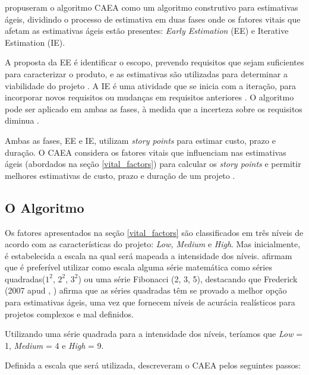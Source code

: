 
 propuseram o algoritmo CAEA como um algoritmo construtivo para estimativas ágeis,
dividindo o processo de estimativa em duas fases onde os fatores vitais que afetam as estimativas ágeis
estão presentes: \textit{Early Estimation} (EE) e {Iterative Estimation} (IE).

A proposta da EE é identificar o escopo, prevendo requisitos que sejam suficientes para caracterizar o produto,
e as estimativas são utilizadas para determinar a viabilidade do projeto \cite{bhalerao09}.
A IE é uma atividade que se inicia com a iteração, para incorporar novos requisitos ou mudanças
em requisitos anteriores \cite{bhalerao09}.
O algoritmo pode ser aplicado em ambas as fases, à medida que a incerteza sobre os requisitos diminua \cite{bhalerao09}.

Ambas as fases, EE e IE, utilizam \textit{story points} para estimar custo, prazo e duração. O CAEA considera os fatores
vitais que influenciam nas estimativas ágeis (abordados na seção \ref{vital_factors}) para calcular os \textit{story points}
e permitir melhores estimativas de custo, prazo e duração de um projeto \cite{bhalerao09}.

  \subsection*{O Algoritmo}
    
    Os fatores apresentados na seção \ref{vital_factors} são classificados em três 
    níveis de acordo com as características do projeto: \textit{Low, Medium} e \textit{High}.
    Mas inicialmente, é estabelecida a escala na qual será mapeada a intensidade dos níveis.
     afirmam que é preferível utilizar como escala alguma série matemática como séries
    quadradas($1^2$, $2^2$, $3^2$) ou uma série Fibonacci (2, 3, 5), destacando que Frederick (2007 apud \citeauthor{bhalerao09}, \citeyear{bhalerao09})
    afirma que as séries quadradas têm se provado a melhor opção para estimativas ágeis, uma vez que fornecem níveis de acurácia 
    realísticos para projetos complexos e mal definidos.
    
    Utilizando uma série quadrada para a intensidade dos níveis,
    teríamos que \textit{Low} = 1, \textit{Medium} = 4 e \textit{High} = 9.
    
    Definida a escala que será utilizada,  descreveram o CAEA pelos seguintes passos:
    
